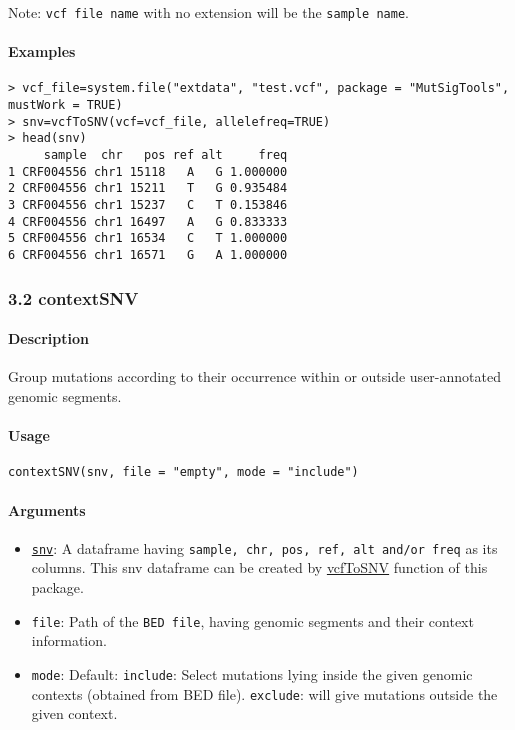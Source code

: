 \documentclass[]{article}
\providecommand{\tightlist}{%
  \setlength{\itemsep}{0pt}\setlength{\parskip}{0pt}}
\let\oldparagraph\paragraph
\renewcommand{\paragraph}[1]{\oldparagraph{#1}\mbox{}}
\begin{document}
Note: \texttt{vcf\ file\ name} with no extension will be the
\texttt{sample\ name}.

\paragraph{\texorpdfstring{\textbf{Examples}}{Examples}}\label{examples}

\begin{verbatim}
> vcf_file=system.file("extdata", "test.vcf", package = "MutSigTools", mustWork = TRUE) 
> snv=vcfToSNV(vcf=vcf_file, allelefreq=TRUE)
> head(snv)
     sample  chr   pos ref alt     freq
1 CRF004556 chr1 15118   A   G 1.000000
2 CRF004556 chr1 15211   T   G 0.935484
3 CRF004556 chr1 15237   C   T 0.153846
4 CRF004556 chr1 16497   A   G 0.833333
5 CRF004556 chr1 16534   C   T 1.000000
6 CRF004556 chr1 16571   G   A 1.000000
\end{verbatim}

\subsubsection{3.2 contextSNV}\label{contextsnv}

\paragraph{\texorpdfstring{\textbf{Description}}{Description}}\label{description-1}

Group mutations according to their occurrence within or outside
user-annotated genomic segments.

\paragraph{\texorpdfstring{\textbf{Usage}}{Usage}}\label{usage-1}

\texttt{contextSNV(snv,\ file\ =\ "empty",\ mode\ =\ "include")}

\paragraph{\texorpdfstring{\textbf{Arguments
}}{Arguments }}\label{arguments-1}

\begin{itemize}
\tightlist
\item
  \protect\hyperlink{snv}{\texttt{snv}}: A dataframe having
  \texttt{sample,\ chr,\ pos,\ ref,\ alt\ and/or\ freq} as its columns.
  This snv dataframe can be created by
  \protect\hyperlink{vcfToSNV}{vcfToSNV} function of this package.
\item
  \texttt{file}: Path of the \texttt{BED\ file}, having genomic segments
  and their context information.
\item
  \texttt{mode}: Default: \texttt{include}: Select mutations lying
  inside the given genomic contexts (obtained from BED file).
  \texttt{exclude}: will give mutations outside the given context.
\end{itemize}
\end{document}
